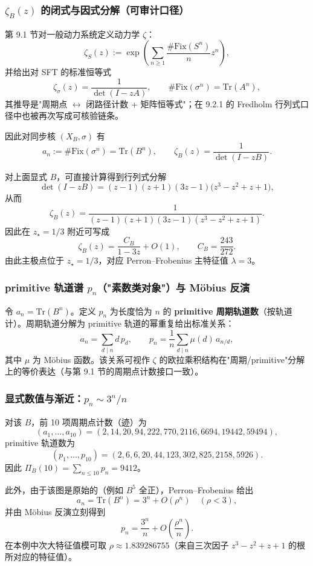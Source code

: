 \subsubsection{\texorpdfstring{$\zeta_B(z)$}{zeta\_B(z)} 的闭式与因式分解（可审计口径）}
第 9.1 节对一般动力系统定义动力学 $\zeta$：
\[
\zeta_S(z):=\exp\!\left(\sum_{n\ge 1}\frac{\#\mathrm{Fix}(S^n)}{n}z^n\right),
\]
并给出对 SFT 的标准恒等式
\[
\zeta_\sigma(z)=\frac{1}{\det(I-zA)},\qquad
\#\mathrm{Fix}(\sigma^n)=\mathrm{Tr}(A^n),
\]
其推导是"周期点 $\leftrightarrow$ 闭路径计数 + 矩阵恒等式"；在 9.2.1 的 Fredholm 行列式口径中也被再次写成可核验链条。

因此对同步核 $(X_B,\sigma)$ 有
\[
a_n:=\#\mathrm{Fix}(\sigma^n)=\mathrm{Tr}(B^n),\qquad
\zeta_B(z)=\frac{1}{\det(I-zB)}.
\]

对上面显式 $B$，可直接计算得到行列式分解
\[
\det(I-zB)=(z-1)(z+1)(3z-1)\bigl(z^3-z^2+z+1\bigr),
\]
从而
\[
\zeta_B(z)=\frac{1}{(z-1)(z+1)(3z-1)(z^3-z^2+z+1)}.
\]
因此在 $z_\star=1/3$ 附近可写成
\[
\zeta_B(z)=\frac{C_B}{1-3z}+O(1),
\qquad
C_B=\frac{243}{272}.
\]
由此主极点位于 $z_\star=1/3$，对应 Perron--Frobenius 主特征值 $\lambda=3$。

\subsubsection{primitive 轨道谱 \texorpdfstring{$p_n$}{p\_n}（"素数类对象"）与 Möbius 反演}
令 $a_n=\mathrm{Tr}(B^n)$。定义 $p_n$ 为长度恰为 $n$ 的 \textbf{primitive 周期轨道数}（按轨道计）。周期轨道分解为 primitive 轨道的幂重复给出标准关系：
\[
a_n=\sum_{d\mid n} d\,p_d,
\qquad
p_n=\frac{1}{n}\sum_{d\mid n}\mu(d)\,a_{n/d},
\]
其中 $\mu$ 为 Möbius 函数。该关系可视作 $\zeta$ 的欧拉乘积结构在"周期/primitive"分解上的等价表达（与第 9.1 节的周期点计数接口一致）。

\subsubsection{显式数值与渐近：\texorpdfstring{$p_n\sim 3^n/n$}{p\_n ~ 3^n/n}}
对该 $B$，前 10 项周期点计数（迹）为
\[
(a_1,\dots,a_{10})=(2,14,20,94,222,770,2116,6694,19442,59494),
\]
primitive 轨道数为
\[
(p_1,\dots,p_{10})=(2,6,6,20,44,123,302,825,2158,5926).
\]
因此 $\Pi_B(10)=\sum_{n\le 10}p_n=9412$。

此外，由于该图是原始的（例如 $B^5$ 全正），Perron--Frobenius 给出
\[
a_n=\mathrm{Tr}(B^n)=3^n+O(\rho^n)
\quad(\rho<3),
\]
并由 Möbius 反演立刻得到
\[
p_n=\frac{3^n}{n}+O\!\left(\frac{\rho^n}{n}\right).
\]
在本例中次大特征值模可取 $\rho\approx 1.839286755$（来自三次因子 $z^3-z^2+z+1$ 的根所对应的特征值）。

